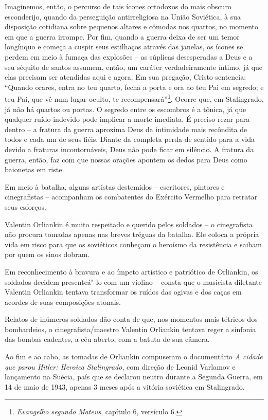 Imaginemos, então, o percurso de tais ícones ortodoxos do mais obscuro
esconderijo, quando da perseguição antirreligiosa na União Soviética, à
sua disposição cotidiana sobre pequenos altares e cômodas nos quartos,
no momento em que a guerra irrompe. Por fim, quando a guerra deixa de
ser um temor longínquo e começa a cuspir seus estilhaços através das
janelas, os ícones se perdem em meio à fumaça das explosões -- as
súplicas desesperadas a Deus e a seu séquito de santos assumem, então,
um caráter verdadeiramente íntimo, já que elas precisam ser atendidas
aqui e agora. Em sua pregação, Cristo sentencia: ``Quando orares, entra
no teu quarto, fecha a porta e ora ao teu Pai em segredo; e teu Pai, que
vê num lugar oculto, te recompensará''\footnote{\emph{Evangelho segundo
  Mateus}, capítulo 6, versículo 6.}. Ocorre que, em Stalingrado, já não
há quartos ou portas. O segredo entre os escombros é a tônica, já que
qualquer ruído indevido pode implicar a morte imediata. É preciso rezar
para dentro -- a fratura da guerra aproxima Deus da intimidade mais
recôndita de todos e cada um de seus fiéis. Diante da completa perda de
sentido para a vida devido a fraturas incontornáveis, Deus não pode
ficar em silêncio. A fratura da guerra, então, faz com que nossas
orações apontem os dedos para Deus como baionetas em riste.

Em meio à batalha, alguns artistas destemidos -- escritores, pintores e
cinegrafistas -- acompanham os combatentes do Exército Vermelho para
retratar seus esforços.

Valentin Orliankin é muito respeitado e querido pelos soldados -- o
cinegrafista não procura tomadas apenas nas breves tréguas da batalha.
Ele coloca a própria vida em risco para que os soviéticos conheçam o
heroísmo da resistência e saibam por quem os sinos dobram.

Em reconhecimento à bravura e ao ímpeto artístico e patriótico de
Orliankin, os soldados decidem presenteá"-lo com um violino -- consta que
o musicista diletante Valentin Orliankin tentava transformar os ruídos
das ogivas e dos caças em acordes de suas composições atonais.

Relatos de inúmeros soldados dão conta de que, nos momentos mais
tétricos dos bombardeios, o cinegrafista/maestro Valentin Orliankin
tentava reger a sinfonia das bombas cadentes, a céu aberto, com a batuta
de sua câmera.

Ao fim e ao cabo, as tomadas de Orliankin compuseram o documentário
\emph{A cidade que parou Hitler: Heroica Stalingrado}, com direção de
Leonid Varlamov e lançamento na Suécia, país que se declarou neutro
durante a Segunda Guerra, em 14 de maio de 1943, apenas 3 meses após a
vitória soviética em Stalingrado.

